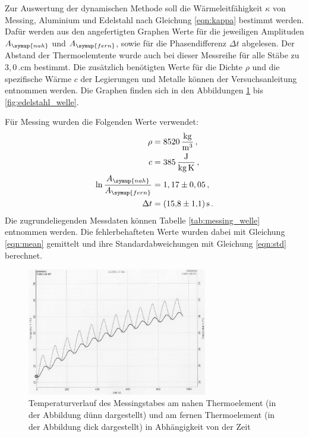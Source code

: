 Zur Auswertung der dynamischen Methode soll die Wärmeleitfähigkeit $\kappa$ von
Messing, Aluminium und Edelstahl nach Gleichung \eqref{eqn:kappa} bestimmt werden.
Dafür werden aus den angefertigten Graphen Werte für die jeweiligen Amplituden
$A_{\symup{nah}}$ und $A_{\symup{fern}}$, sowie für die Phasendifferenz $\Delta t$ abgelesen. Der Abstand der
Thermoelemtente wurde auch bei dieser Messreihe für alle Stäbe zu $3,0$\,.cm bestimmt.
Die zusätzlich benötigten Werte für die Dichte $\rho$ und die spezifische Wärme $c$
der Legierungen und Metalle können der Versuchsanleitung entnommen werden. Die Graphen
finden sich in den Abbildungen \ref{fig:messing_welle} bis \ref{fig:edelstahl_welle}.

Für Messing wurden die Folgenden Werte verwendet:
\begin{align}
  \rho &= \SI{8520}{\kilo\gram\per\cubic\meter}\,, \nonumber\\
  c &= \SI{385}{\joule\per\kilo\gram\per\kelvin}\,, \nonumber\\
  \ln{\frac{A_{\symup{nah}}}{A_{\symup{fern}}}} &= 1,17 \pm 0,05 \,, \nonumber\\
  \Delta t &= \SI{15.8(11)}{\second} \,. \nonumber
\end{align}
Die zugrundeliegenden Messdaten können Tabelle \ref{tab:messing_welle} entnommen
werden. Die fehlerbehafteten Werte wurden dabei mit Gleichung \eqref{eqn:mean} gemittelt
und ihre Standardabweichungen mit Gleichung \eqref{eqn:std} berechnet.

\begin{figure}
  \centering
  \includegraphics[width=0.7\textwidth]{data/t1undt2_welle.JPEG}
  \caption{Temperaturverlauf des Messingstabes am nahen Thermoelement (in der Abbildung dünn dargestellt)
  und am fernen Thermoelement (in der Abbildung dick dargestellt) in Abhängigkeit von der Zeit}
  \label{fig:messing_welle}
\end{figure}

